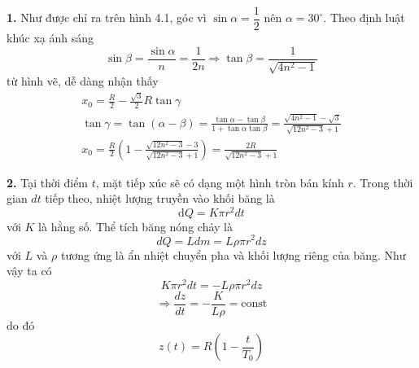 \noindent\textbf{1.} Như được chỉ ra trên hình 4.1, góc vì $\sin\alpha=\dfrac{1}{2}$ nên $\alpha=30^\circ$. Theo định luật khúc xạ ánh sáng
\begin{equation*}
  \sin\beta=\frac{\sin\alpha}{n}=\frac{1}{2n}\Rightarrow\tan\beta=\frac{1}{\sqrt{4n^{2}-1}}
\end{equation*}
từ hình vẽ, dễ dàng nhận thấy
\begin{equation*}
  \begin{gathered}
    x_{0}=\frac{R}{2}-\frac{\sqrt{3}}{2}R\tan\gamma \\
    \tan\gamma=\tan(\alpha-\beta)=\frac{\tan\alpha-\tan\beta}{1+\tan\alpha\tan\beta}=\frac{\sqrt{4n^{2}-1}-\sqrt{3}}{\sqrt{12n^{2}-3}+1} \\
    x_{0}=\frac{R}{2}\left(1-\frac{\sqrt{12n^{2}-3}-3}{\sqrt{12n^{2}-3}+1}\right)=\frac{2R}{\sqrt{12n^{2}-3}+1}
  \end{gathered}
\end{equation*}

\noindent\textbf{2.} Tại thời điểm $t$, mặt tiếp xúc sẽ có dạng một hình tròn bán kính $r$. Trong thời gian $dt$ tiếp theo, nhiệt lượng truyền vào khối băng là
\begin{equation*}
  \mathrm{d}Q=K\pi r^{2}dt
\end{equation*}
với $K$ là hằng số. Thể tích băng nóng chảy là
\begin{equation*}
  dQ=Ldm=L\rho\pi r^{2}dz
\end{equation*}
với $L$ và $\rho$ tương ứng là ẩn nhiệt chuyển pha và khối lượng riêng của băng. Như vậy ta có
\begin{equation*}
  K\pi r^{2}dt=-L\rho\pi r^{2}dz
\end{equation*}
\begin{equation*}
  \Rightarrow\frac{dz}{dt}=-\frac{K}{L\rho}=\text{const}
\end{equation*}
do đó
\begin{equation*}
  z(t)=R\left(1-\frac{t}{T_0}\right)
\end{equation*}

